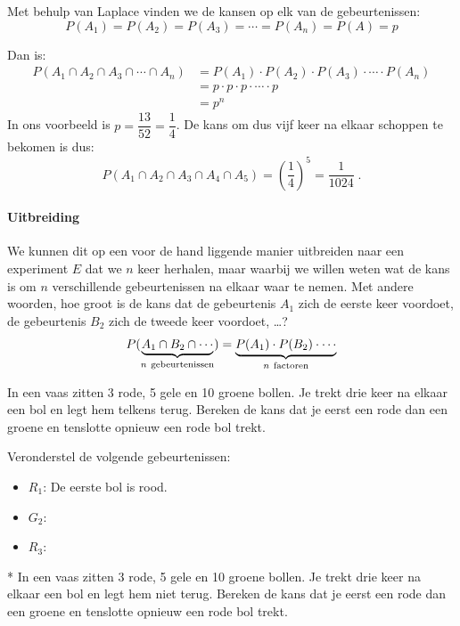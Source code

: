 \documentclass[12pt,twoside]{article}
\begin{document}
Met behulp van Laplace vinden we de kansen op elk van de gebeurtenissen:
$$P(A_1)=P(A_2)=P(A_3)=\cdots=P(A_n)=P(A)=p$$

Dan is:
\begin{align*}
  P(A_1\cap A_2 \cap A_3\cap \cdots \cap A_n)&=P(A_1)\cdot P(A_2)\cdot P(A_3)\cdot \cdots \cdot P(A_n)\\
                                             &=p\cdot p\cdot p\cdot \cdots \cdot p\\
                                             &= p^n
\end{align*}
In ons voorbeeld is $p=\dfrac{13}{52}=\dfrac{1}{4}$. De kans om dus vijf keer na elkaar schoppen te bekomen is dus:
$$P(A_1\cap A_2 \cap A_3\cap A_4 \cap A_5)=\left(\dfrac{1}{4}\right)^5=\dfrac{1}{1024}\;.$$

\paragraph*{Uitbreiding} We kunnen dit op een voor de hand liggende manier uitbreiden naar een experiment $E$ dat we $n$ keer herhalen, maar waarbij we willen weten wat de kans is om $n$ verschillende gebeurtenissen na elkaar waar te nemen. Met andere woorden, hoe groot is de kans dat de gebeurtenis $A_1$ zich de eerste keer voordoet, de gebeurtenis $B_2$ zich de tweede keer voordoet, \ldots?
$$P(\underbrace{A_1\cap B_2\cap\cdots}_{n\mbox{ \scriptsize gebeurtenissen}})=\underbrace{P(A_1)\cdot P(B_2)\cdot \cdots}_{n\mbox{ \scriptsize factoren}}$$

\begin{oefening}
In een vaas zitten 3 rode, 5 gele en 10 groene bollen. Je trekt drie keer na elkaar een bol en legt hem telkens terug. Bereken de kans dat je eerst een rode dan een groene en tenslotte opnieuw een rode bol trekt.

Veronderstel de volgende gebeurtenissen:
\begin{itemize}
  \itemsep0.2em
  \item $R_1$: De eerste bol is rood.
  \item $G_2$: \arulefill
  \item $R_3$: \arulefill
\end{itemize}
\vspace*{0.1cm}
\end{oefening}

\begin{oefening}*
In een vaas zitten 3 rode, 5 gele en 10 groene bollen. Je trekt drie keer na elkaar een bol en legt hem niet terug. Bereken de kans dat je eerst een rode dan een groene en tenslotte opnieuw een rode bol trekt.
\end{oefening}
\end{document}
